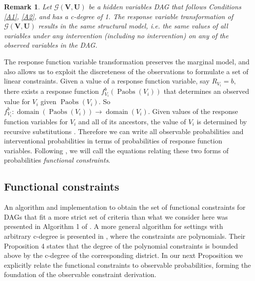 \documentclass[12pt]{article}
\newtheorem{remark}{Remark}
\DeclareMathOperator{\Paobs}{Paobs}
\newcommand{\bU}{\boldsymbol{U}}
\newcommand{\bV}{\boldsymbol{V}}
\begin{document}
\begin{remark} \label{rmk1}
Let $\mathcal{G}(\bV, \bU)$ be a hidden variables DAG that follows Conditions \ref{A1}, \ref{A2}, and has a c-degree of 1. The response variable transformation of $\mathcal{G}(\bV, \bU)$ results in the same structural model, i.e. the same values of all variables under any intervention (including no intervention) on any of the observed variables in the DAG. 
\end{remark}

The response function variable transformation preserves the marginal model, and also allows us to exploit the discreteness of the observations to formulate a set of linear constraints. Given a value of a response function variable, say $R_{V_i} = b$, there exists a response function $f_{V_i}^b(\Paobs(V_i))$ that determines an observed value for $V_i$ given $\Paobs(V_i)$. So $f_{V_i}^b: \operatorname{domain}(\Paobs(V_i)) \rightarrow \operatorname{domain}(V_i)$. Given values of the response function variables for $V_i$ and all of its ancestors, the value of $V_i$ is determined by recursive substitutions \citep{sachs2023general, duarte2023automated}. Therefore we can write all observable probabilities and interventional probabilities in terms of probabilities of response function variables. Following \citet{tian2002testable}, we will call the equations relating these two forms of probabilities \emph{functional constraints}. 


\subsection{Functional constraints}

An algorithm and implementation to obtain the set of functional constraints for DAGs that fit a more strict set of criteria than what we consider here was presented in Algorithm 1 of \citet{sachs2023general}. A more general algorithm for settings with arbitrary c-degree is presented in \citet{duarte2023automated}, where the constraints are polynomials. Their Proposition 4 states that the degree of the polynomial constraints is bounded above by the c-degree of the corresponding district. In our next Proposition we explicitly relate the functional constraints to observable probabilities, forming the foundation of the observable constraint derivation.
\end{document}
